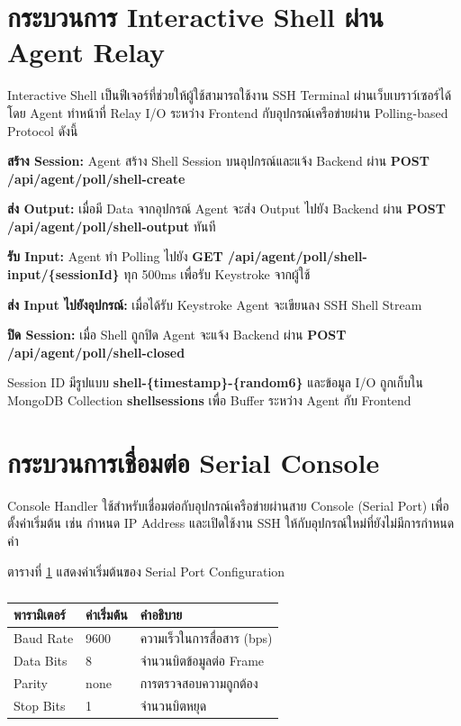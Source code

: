 \section{กระบวนการ Interactive Shell ผ่าน Agent Relay}
\hspace*{1.3em}
Interactive Shell เป็นฟีเจอร์ที่ช่วยให้ผู้ใช้สามารถใช้งาน SSH Terminal ผ่านเว็บเบราว์เซอร์ได้ โดย Agent ทำหน้าที่ Relay I/O ระหว่าง Frontend กับอุปกรณ์เครือข่ายผ่าน Polling-based Protocol ดังนี้

\begin{mycustomenum2}
    \item \textbf{สร้าง Session:} Agent สร้าง Shell Session บนอุปกรณ์และแจ้ง Backend ผ่าน \textbf{POST /api/agent/poll/shell-create}
    \item \textbf{ส่ง Output:} เมื่อมี Data จากอุปกรณ์ Agent จะส่ง Output ไปยัง Backend ผ่าน \textbf{POST /api/agent/poll/shell-output} ทันที
    \item \textbf{รับ Input:} Agent ทำ Polling ไปยัง \textbf{GET /api/agent/poll/shell-input/\{sessionId\}} ทุก 500ms เพื่อรับ Keystroke จากผู้ใช้
    \item \textbf{ส่ง Input ไปยังอุปกรณ์:} เมื่อได้รับ Keystroke Agent จะเขียนลง SSH Shell Stream
    \item \textbf{ปิด Session:} เมื่อ Shell ถูกปิด Agent จะแจ้ง Backend ผ่าน \textbf{POST /api/agent/poll/shell-closed}
\end{mycustomenum2}

\hspace*{1.3em}
Session ID มีรูปแบบ \textbf{shell-\{timestamp\}-\{random6\}} และข้อมูล I/O ถูกเก็บใน MongoDB Collection \textbf{shellsessions} เพื่อ Buffer ระหว่าง Agent กับ Frontend

\section{กระบวนการเชื่อมต่อ Serial Console}
\hspace*{1.3em}
Console Handler ใช้สำหรับเชื่อมต่อกับอุปกรณ์เครือข่ายผ่านสาย Console (Serial Port) เพื่อตั้งค่าเริ่มต้น เช่น กำหนด IP Address และเปิดใช้งาน SSH ให้กับอุปกรณ์ใหม่ที่ยังไม่มีการกำหนดค่า

\hspace*{1.3em}
ตารางที่ \ref{tabD2:SerialConfig} แสดงค่าเริ่มต้นของ Serial Port Configuration

\begin{table}[H]
\centering
\caption{}
\label{tabD2:SerialConfig}
\fontSixTeen
\begin{tabularx}{\textwidth}{|l|l|X|}
\hline
\textbf{พารามิเตอร์} & \textbf{ค่าเริ่มต้น} & \textbf{คำอธิบาย} \\
\hline
Baud Rate & 9600 & ความเร็วในการสื่อสาร (bps) \\
\hline
Data Bits & 8 & จำนวนบิตข้อมูลต่อ Frame \\
\hline
Parity & none & การตรวจสอบความถูกต้อง \\
\hline
Stop Bits & 1 & จำนวนบิตหยุด \\
\hline
\end{tabularx}
\end{table}

